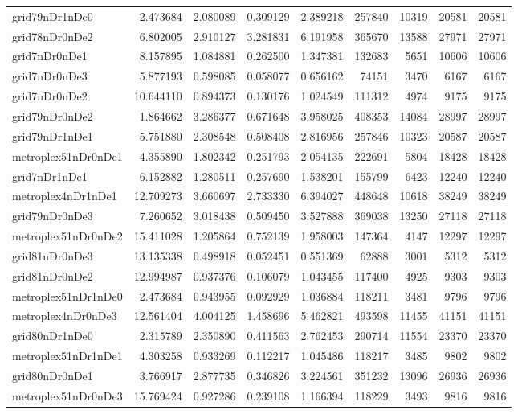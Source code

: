 \begin{longtable}{|l|r|r|r|r|r|r|r|r|}
grid79nDr1nDe0 & 2.473684 & 2.080089 & 0.309129 & 2.389218 & 257840 & 10319 & 20581 & 20581 \\
grid78nDr0nDe2 & 6.802005 & 2.910127 & 3.281831 & 6.191958 & 365670 & 13588 & 27971 & 27971 \\
grid7nDr0nDe1 & 8.157895 & 1.084881 & 0.262500 & 1.347381 & 132683 & 5651 & 10606 & 10606 \\
grid7nDr0nDe3 & 5.877193 & 0.598085 & 0.058077 & 0.656162 & 74151 & 3470 & 6167 & 6167 \\
grid7nDr0nDe2 & 10.644110 & 0.894373 & 0.130176 & 1.024549 & 111312 & 4974 & 9175 & 9175 \\
grid79nDr0nDe2 & 1.864662 & 3.286377 & 0.671648 & 3.958025 & 408353 & 14084 & 28997 & 28997 \\
grid79nDr1nDe1 & 5.751880 & 2.308548 & 0.508408 & 2.816956 & 257846 & 10323 & 20587 & 20587 \\
metroplex51nDr0nDe1 & 4.355890 & 1.802342 & 0.251793 & 2.054135 & 222691 & 5804 & 18428 & 18428 \\
grid7nDr1nDe1 & 6.152882 & 1.280511 & 0.257690 & 1.538201 & 155799 & 6423 & 12240 & 12240 \\
metroplex4nDr1nDe1 & 12.709273 & 3.660697 & 2.733330 & 6.394027 & 448648 & 10618 & 38249 & 38249 \\
grid79nDr0nDe3 & 7.260652 & 3.018438 & 0.509450 & 3.527888 & 369038 & 13250 & 27118 & 27118 \\
metroplex51nDr0nDe2 & 15.411028 & 1.205864 & 0.752139 & 1.958003 & 147364 & 4147 & 12297 & 12297 \\
grid81nDr0nDe3 & 13.135338 & 0.498918 & 0.052451 & 0.551369 & 62888 & 3001 & 5312 & 5312 \\
grid81nDr0nDe2 & 12.994987 & 0.937376 & 0.106079 & 1.043455 & 117400 & 4925 & 9303 & 9303 \\
metroplex51nDr1nDe0 & 2.473684 & 0.943955 & 0.092929 & 1.036884 & 118211 & 3481 & 9796 & 9796 \\
metroplex4nDr0nDe3 & 12.561404 & 4.004125 & 1.458696 & 5.462821 & 493598 & 11455 & 41151 & 41151 \\
grid80nDr1nDe0 & 2.315789 & 2.350890 & 0.411563 & 2.762453 & 290714 & 11554 & 23370 & 23370 \\
metroplex51nDr1nDe1 & 4.303258 & 0.933269 & 0.112217 & 1.045486 & 118217 & 3485 & 9802 & 9802 \\
grid80nDr0nDe1 & 3.766917 & 2.877735 & 0.346826 & 3.224561 & 351232 & 13096 & 26936 & 26936 \\
metroplex51nDr0nDe3 & 15.769424 & 0.927286 & 0.239108 & 1.166394 & 118229 & 3493 & 9816 & 9816 \\

\end{longtable}
